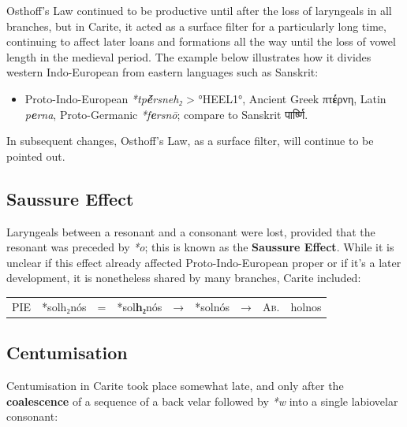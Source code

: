 \documentclass[svgnames,x11names,b5paper]{book}
\begin{document}
            Osthoff's Law continued to be productive until after the loss of laryngeals in all branches, but in Carite, it acted as a surface filter for a particularly long time, continuing to affect later loans and formations all the way until the loss of vowel length in the medieval period. The example below illustrates how it divides western Indo-European from eastern languages such as Sanskrit:
\begin{itemize}
\item  Proto-Indo-European \textit{*tp\textbf{ḗ}rsneh₂} > °HEEL1°, Ancient Greek πτ\textbf{έ}ρνη, Latin \textit{p\textbf{e}rna}, Proto-Germanic \textit{*f\textbf{e}rsnō}; compare to Sanskrit पार्ष्णि.\\
\end{itemize}
In subsequent changes, Osthoff's Law, as a surface filter, will continue to be pointed out.

            \subsection{Saussure Effect}
        
        Laryngeals between a resonant and a consonant were lost, provided that the resonant was preceded by \textit{*o}; this is known as the \textbf{Saussure Effect}. While it is unclear if this effect already affected Proto-Indo-European proper or if it's a later development, it is nonetheless shared by many branches, Carite included:

            \begin{table}[H]
                \begin{center}
                \begin{tabular}{llcllllll}
                \textsc{PIE} & *solh₂nós & = & *sol\textbf{h₂}nós & → & *solnós & → & \textsc{Ab.} & holnos\\
                \end{tabular}
                \end{center}
                \end{table}
        
            \subsection{Centumisation}
        
        Centumisation in Carite took place somewhat late, and only after the \textbf{coalescence} of a sequence of a back velar followed by \textit{*w} into a single labiovelar consonant:
\end{document}
